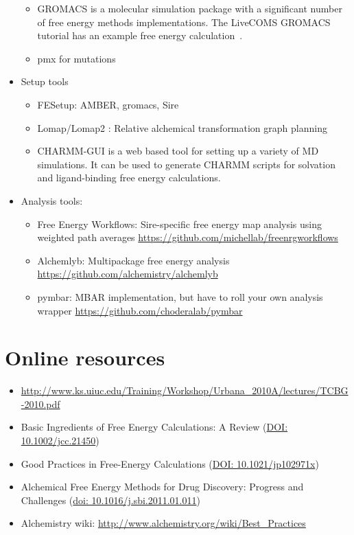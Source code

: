\documentclass[9pt,bestpractices]{livecoms}
\begin{document}
\begin{itemize}
\begin{itemize}
	\item GROMACS is a molecular simulation package with a significant number of free energy methods implementations. The LiveCOMS GROMACS tutorial has an example free energy calculation~\cite{lemkul2018From}.
	\item pmx for mutations
	\end{itemize}
\item Setup tools
	\begin{itemize}
	\item FESetup: AMBER, gromacs, Sire
	\item Lomap/Lomap2 : Relative alchemical transformation graph planning
	\item CHARMM-GUI is a web based tool for setting up a variety of MD simulations. It can be used to generate CHARMM scripts for solvation and ligand-binding free energy calculations.
	\end{itemize}
\item Analysis tools:
	\begin{itemize}
	\item Free Energy Workflows: Sire-specific free energy map analysis using weighted path averages
	\url{https://github.com/michellab/freenrgworkflows}
	\item Alchemlyb: Multipackage free energy analysis
	\url{https://github.com/alchemistry/alchemlyb}
	\item pymbar: MBAR implementation, but have to roll your own analysis wrapper
	\url{https://github.com/choderalab/pymbar}
	\end{itemize}
\end{itemize}

\section{Online resources}
\begin{itemize}
\item \url{http://www.ks.uiuc.edu/Training/Workshop/Urbana_2010A/lectures/TCBG-2010.pdf}
\item Basic Ingredients of Free Energy Calculations: A Review (\url{DOI: 10.1002/jcc.21450})
\item Good Practices in Free-Energy Calculations (\url{DOI: 10.1021/jp102971x})
\item Alchemical Free Energy Methods for Drug Discovery: Progress and Challenges (\url{doi: 10.1016/j.sbi.2011.01.011})
\item Alchemistry wiki: \url{http://www.alchemistry.org/wiki/Best_Practices}
\end{itemize}
\end{document}
